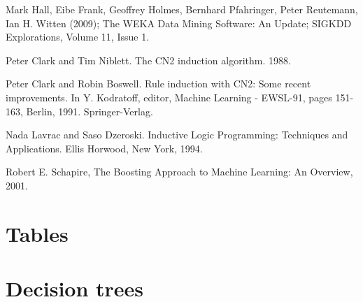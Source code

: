 \documentclass[a4paper]{llncs}
\begin{document}
\begin{thebibliography}{1}
Mark Hall, Eibe Frank, Geoffrey Holmes, Bernhard Pfahringer, Peter Reutemann, Ian H. Witten (2009); The WEKA Data Mining Software: An Update; SIGKDD Explorations, Volume 11, Issue 1.

Peter Clark and Tim Niblett. The CN2 induction algorithm. 1988.

Peter Clark and Robin Boswell. Rule induction with CN2: Some recent improvements. In Y. Kodratoff, editor, Machine Learning - EWSL-91, pages 151-163, Berlin, 1991. Springer-Verlag.

Nada Lavrac and Saso Dzeroski. Inductive Logic Programming: Techniques and Applications. Ellis Horwood, New York, 1994.

Robert E. Schapire, The Boosting Approach to Machine Learning: An Overview, 2001.

\end{thebibliography}

\clearpage

\appendix

\section{Tables}

\clearpage
\section{Decision trees}
\end{document}
